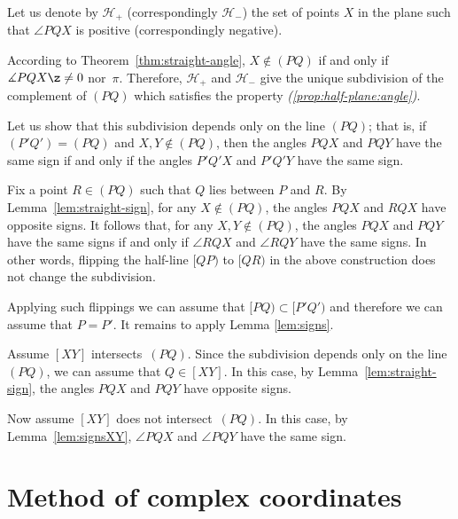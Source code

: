 {
Let us denote by $\mathcal{H}_+$ (correspondingly $\mathcal{H}_-$) 
the set of points $X$ in the plane such that
$\angle PQX$ is positive (correspondingly negative).

According to Theorem~\ref{thm:straight-angle},
$X\notin (PQ)$ if and only if 
$\measuredangle PQX\z\ne 0$ nor~$\pi$.
Therefore, $\mathcal{H}_+$ and $\mathcal{H}_-$
give the unique subdivision of the complement of $(PQ)$ which satisfies the property \textit{(\ref{prop:half-plane:angle})}.

\medskip

Let us show that this subdivision depends only on the line $(PQ)$;
that is, if $(P'Q')=(PQ)$ and $X,Y\notin (PQ)$,
then the angles $PQX$ and $PQY$ have the same sign
if and only if the angles $P'Q'X$ and $P'Q'Y$ have the same sign.

Fix a point $R\in(PQ)$ such that $Q$ lies between $P$ and $R$. 
By Lemma~\ref{lem:straight-sign}, for any $X\notin(PQ)$, the angles $PQX$ and $RQX$ have opposite signs.
It follows that, for any $X,Y\notin(PQ)$, the angles $PQX$ and $PQY$ have the same signs if 
and only if $\angle RQX$ and $\angle RQY$ have the same signs.
In other words, flipping the half-line $[QP)$ to $[QR)$ in the above construction does not change the subdivision.

Applying such flippings we can assume that $[PQ)\subset [P'Q')$
and therefore we can assume that $P=P'$.
It remains to apply Lemma \ref{lem:signs}.

\medskip

Assume $[XY]$ intersects~$(PQ)$.
Since the subdivision depends only on the line $(PQ)$, 
we can assume that $Q\in[XY]$.
In this case, by Lemma~\ref{lem:straight-sign},
the angles $PQX$ and $PQY$ have opposite signs.


Now assume $[XY]$ does not intersect~$(PQ)$.
In this case, by Lemma~\ref{lem:signsXY},
$\angle PQX$ and $\angle PQY$ have the same sign.
\qeds



















\section*{Method of complex coordinates}

}
